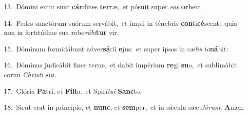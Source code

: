 {\numbfont\textcolor{\numbcolor}{13.}}~Dómini enim sunt \textbf{cár}\-dines \textbf{ter}\-ræ,~\star et pósuit super \textit{e}\-\textit{os} \textbf{or}\-bem.\par
{\numbfont\textcolor{\numbcolor}{14.}}~Pedes sanctórum suórum servábit,~\dagger et ímpii in ténebris \textbf{con}\-ti\-\textbf{cé}\-scent:~\star quia non in fortitúdine sua robo\-\textit{rá}\-\textit{bi}\textbf{tur} vir.\par
{\numbfont\textcolor{\numbcolor}{15.}}~Dóminum formidábunt adver\-\textbf{sá}\-rii \textbf{e}\-jus:~\star et super ipsos in cæ\textit{lis} \textit{to}\-\textbf{ná}bit:\par
{\numbfont\textcolor{\numbcolor}{16.}}~Dóminus judicábit fines terræ,~\dagger et dabit impérium \textbf{re}\-gi \textbf{su}\-o,~\star et sublimábit cornu \textit{Chris}\-\textit{ti} \textbf{su}\-i.\par
{\numbfont\textcolor{\numbcolor}{17.}}~Glória \textbf{Pa}\-tri, et \textbf{Fí}\-\textbf{li}o,~\star et Spirí\-\textit{tu}\-\textit{i} \textbf{Sanc}\-to.\par
{\numbfont\textcolor{\numbcolor}{18.}}~Sicut erat in princípio, et \textbf{nunc}\-, et \textbf{sem}\-per,~\star et in sǽcula sæcu\-\textit{ló}\-\textit{rum}. \textbf{A}\-men.\par
